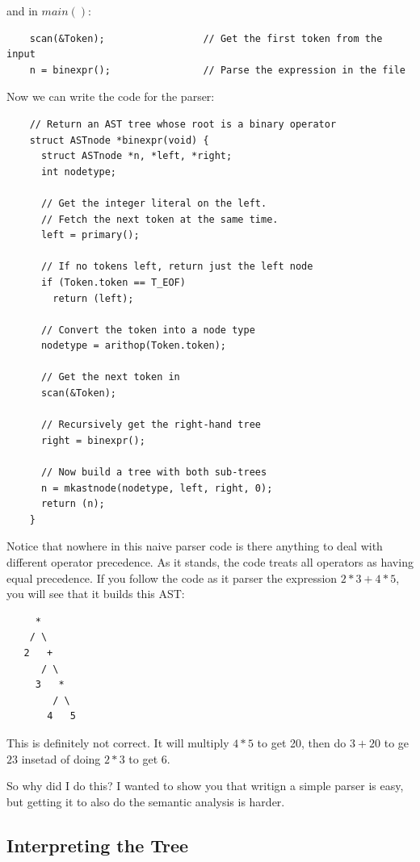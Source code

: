 \documentclass[a4paper,12pt]{article}
\begin{document}
and in $main()$:

\begin{lstlisting}
    scan(&Token);                 // Get the first token from the input
    n = binexpr();                // Parse the expression in the file
\end{lstlisting}

Now we can write the code for the parser:

\begin{lstlisting}
    // Return an AST tree whose root is a binary operator
    struct ASTnode *binexpr(void) {
      struct ASTnode *n, *left, *right;
      int nodetype;

      // Get the integer literal on the left.
      // Fetch the next token at the same time.
      left = primary();

      // If no tokens left, return just the left node
      if (Token.token == T_EOF)
        return (left);

      // Convert the token into a node type
      nodetype = arithop(Token.token);

      // Get the next token in
      scan(&Token);

      // Recursively get the right-hand tree
      right = binexpr();

      // Now build a tree with both sub-trees
      n = mkastnode(nodetype, left, right, 0);
      return (n);
    }
\end{lstlisting}

Notice that nowhere in this naive parser code is there anything to deal with different operator precedence. As it stands, the code treats all operators as having equal precedence. If you follow the code as it parser the expression $2*3+4*5$, you will see that it builds this AST:

\begin{lstlisting}
     *
    / \
   2   +
      / \
     3   *
        / \
       4   5
\end{lstlisting}

This is definitely not correct. It will multiply $4*5$ to get 20, then do $3+20$ to ge $23$ insetad of doing $2*3$ to get 6.

So why did I do this? I wanted to show you that writign a simple parser is easy, but getting it to also do the semantic analysis is harder.

\subsection{Interpreting the Tree}
\end{document}
